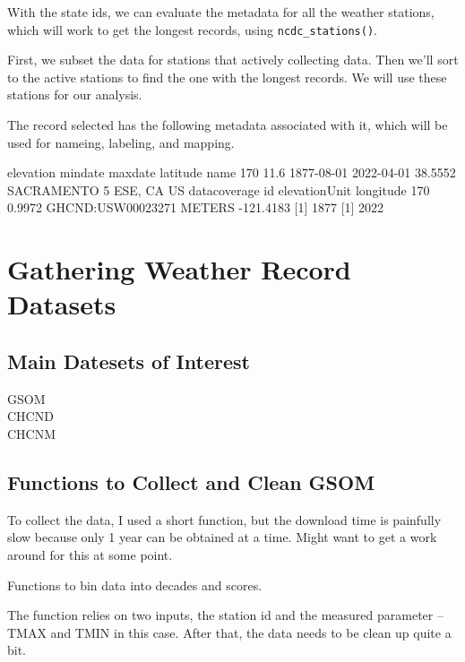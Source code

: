 \documentclass{article}\usepackage[]{graphicx}\usepackage[]{color}
\begin{document}
With the state ids, we can evaluate the metadata for all the weather stations, which will work to get the longest records, using \texttt{ncdc\_stations()}. 

First, we subset the data for stations that actively collecting data. Then we'll sort to the active stations to find the one with the longest records. We will use these stations for our analysis.



The record selected has the following metadata associated with it, which will be used for nameing, labeling, and mapping. 

    elevation    mindate    maxdate latitude                    name
170      11.6 1877-08-01 2022-04-01  38.5552 SACRAMENTO 5 ESE, CA US
    datacoverage                id elevationUnit longitude
170       0.9972 GHCND:USW00023271        METERS -121.4183
[1] 1877
[1] 2022


\section{Gathering Weather Record Datasets}

\subsection{Main Datesets of Interest}

\begin{description}
  \item[GSOM]
  \item[CHCND]
  \item[CHCNM]
\end{description}

\subsection{Functions to Collect and Clean GSOM}

To collect the data, I used a short function, but the download time is painfully slow because only 1 year can be obtained at a time. Might want to get a work around for this at some point. 



Functions to bin data into decades and scores. 



The function relies on two inputs, the station id and the measured parameter -- TMAX and TMIN in this case. After that, the data needs to be clean up quite a bit. 
\end{document}
